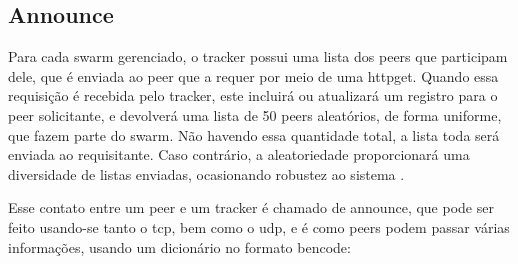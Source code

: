
\subsection*{Announce}

Para cada \gls*{swarm} gerenciado, o \gls*{tracker} possui uma lista dos \glspl*{peer}
que participam dele, que é enviada ao \gls*{peer} que a requer por meio de uma
\gls{httpget}. Quando essa requisição é recebida pelo \gls*{tracker}, este incluirá ou
atualizará um registro para o \gls*{peer} solicitante, e devolverá uma lista de 50
\glspl*{peer} aleatórios, de forma uniforme, que fazem parte do \gls*{swarm}. Não
havendo essa quantidade total, a lista toda será enviada ao requisitante. Caso
contrário, a aleatoriedade proporcionará uma diversidade de listas enviadas,
ocasionando robustez ao sistema \cite{wikitheory:tracker-response}.

Esse contato entre um \gls*{peer} e um \gls*{tracker} é chamado de \gls{announce}, que
pode ser feito usando-se tanto o \gls{tcp}, bem como o \gls{udp}, e é como \glspl*{peer}
podem passar várias informações, usando um dicionário no formato \gls*{bencode}:

